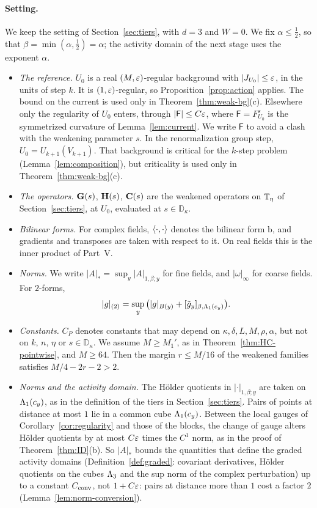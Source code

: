\paragraph{Setting.} We keep the setting of Section~\ref{sec:tiers}, with $d=3$ and $W=0$. We fix $\alpha\le\frac12$, so that $\beta=\min(\alpha,\frac12)=\alpha$; the activity domain of the next stage uses the exponent $\alpha$.
\begin{itemize}
\item \emph{The reference.} $U_0$ is a real $(M,\varepsilon)$-regular background with $|J_{U_0}|\le\varepsilon$, in the units of step $k$. It is $(1,\varepsilon)$-regular, so Proposition~\ref{prop:action} applies. The bound on the current is used only in Theorem~\ref{thm:weak-bg}(c). Elsewhere only the regularity of $U_0$ enters, through $|\mathsf F|\le C\varepsilon$, where $\mathsf F=F^s_{U_0}$ is the symmetrized curvature of Lemma~\ref{lem:current}. We write $\mathsf F$ to avoid a clash with the weakening parameter $s$. In the renormalization group step, $U_0=U_{k+1}(V_{k+1})$. That background is critical for the $k$-step problem (Lemma~\ref{lem:composition}), but criticality is used only in Theorem~\ref{thm:weak-bg}(c).
\item \emph{The operators.} $\mathbf G(s)$, $\mathbf H(s)$, $\mathbf C(s)$ are the weakened operators on $\mathbb T_\eta$ of Section~\ref{sec:tiers}, at $U_0$, evaluated at $s\in\mathbb D_\kappa$.
\item \emph{Bilinear forms.} For complex fields, $\langle \cdot,\cdot\rangle$ denotes the bilinear form $\mathrm b$, and gradients and transposes are taken with respect to it. On real fields this is the inner product of Part~V.
\item \emph{Norms.} We write $|A|_*=\sup_y|A|_{1,\beta;y}$ for fine fields, and $|\omega|_\infty$ for coarse fields. For $2$-forms,
\[
|g|_{(2)}=\sup_y\big(|g|_{B(y)}+[\tilde g_y]_{\beta,\Lambda_1(c_y)}\big).
\]
\item \emph{Constants.} $C_P$ denotes constants that may depend on $\kappa,\delta,L,M,\rho,\alpha$, but not on $k$, $n$, $\eta$ or $s\in\mathbb D_\kappa$. We assume $M\ge M_1'$, as in Theorem~\ref{thm:HC-pointwise}, and $M\ge64$. Then the margin $r\le M/16$ of the weakened families satisfies $M/4-2r-2>2$.
\item \emph{Norms and the activity domain.} The H\"older quotients in $|\cdot|_{1,\beta;y}$ are taken on $\Lambda_1(c_y)$, as in the definition of the tiers in Section~\ref{sec:tiers}. Pairs of points at distance at most $1$ lie in a common cube $\Lambda_1(c_y)$. Between the local gauges of Corollary~\ref{cor:regularity} and those of the blocks, the change of gauge alters H\"older quotients by at most $C\varepsilon$ times the $C^1$ norm, as in the proof of Theorem~\ref{thm:ID}(b). So $|A|_*$ bounds the quantities that define the graded activity domains (Definition~\ref{def:graded}: covariant derivatives, H\"older quotients on the cubes $\Lambda_3$ and the sup norm of the complex perturbation) up to a constant $C_{\rm conv}$, not $1+C\varepsilon$: pairs at distance more than $1$ cost a factor $2$ (Lemma~\ref{lem:norm-conversion}).
\end{itemize}

